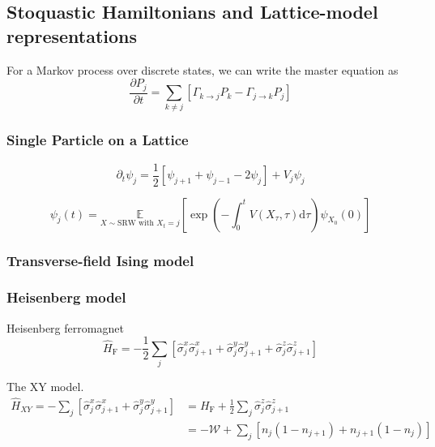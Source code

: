 \subsection{Stoquastic Hamiltonians and Lattice-model representations}
\label{subsec:fk-latt}
For a Markov process over discrete states, we can write the master equation as 
\begin{equation}
	\frac{\partial P_{j}}{\partial t}=\sum_{k \neq j}\left[\Gamma_{k \rightarrow j} P_{k}-\Gamma_{j \rightarrow k} P_{j}\right]
\end{equation}





\subsubsection{Single Particle on a Lattice}
\begin{equation}
	\partial_{t} \psi_{j}=\frac{1}{2}\left[\psi_{j+1}+\psi_{j-1}-2 \psi_{j}\right]+V_{j} \psi_{j}
\end{equation}

\begin{equation}
	\psi_{j}(t)=\underset{X \sim \mathrm{SRW} \text { with } X_{t}=j}{\mathbb{E}} \left[\exp \left(-\int_{0}^{t}  V\left(X_{\tau}, \tau\right) \mathrm{d} \tau \right) \psi_{X_{0}}(0)\right]
\end{equation}

\subsubsection{Transverse-field Ising model}

\subsubsection{Heisenberg model}
Heisenberg ferromagnet
\begin{equation}
	\hat H_{\mathrm{F}}=-\frac{1}{2} \sum_{j}\left[\hat{\sigma}_{j}^{x} \hat{\sigma}_{j+1}^{x}+\hat{\sigma}_{j}^{y} \hat{\sigma}_{j+1}^{y}+\hat{\sigma}_{j}^{z} \hat{\sigma}_{j+1}^{z}\right]
\end{equation}

The XY model.
\begin{equation}
	\begin{aligned} 
		\hat H_{X Y}=-\sum_{j}\left[\hat{\sigma}_{j}^{x} \hat{\sigma}_{j+1}^{x}+\hat{\sigma}_{j}^{y} \hat{\sigma}_{j+1}^{y}\right] &=H_{\mathrm{F}}+\frac{1}{2} \sum_{j} \hat{\sigma}_{j}^{z} \hat{\sigma}_{j+1}^{z} \\ 						&=-\mathcal{W}+\sum_{j}\left[n_{j}\left(1-n_{j+1}\right)+n_{j+1}\left(1-n_{j}\right)\right] 
	\end{aligned}
\end{equation}

